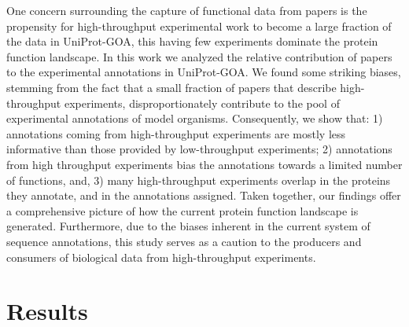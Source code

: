 \documentclass[12pt]{article}
\begin{document}
One concern surrounding the capture of functional data from papers is the propensity for
high-throughput experimental work to become a large fraction of the data in UniProt-GOA,
this having few experiments dominate the protein function landscape.  In this work we
analyzed the relative contribution of papers to the experimental annotations in UniProt-GOA.
We found some striking biases, stemming from the fact that a small fraction of papers that
describe high-throughput experiments, disproportionately contribute to the pool of
experimental annotations of model organisms. Consequently, we show that: 1) annotations
coming from high-throughput experiments are mostly less informative than those provided by
low-throughput experiments;  2) annotations from high throughput experiments bias the
annotations towards a limited number of functions, and, 3) many high-throughput experiments
overlap in the proteins they annotate, and in the annotations assigned. Taken together, our
findings offer a comprehensive picture of how the current protein function landscape is
generated. Furthermore, due to the biases inherent in the current system of sequence
annotations, this study serves as a caution to the producers and consumers of biological data
from high-throughput experiments. 


\section*{Results}
\end{document}
